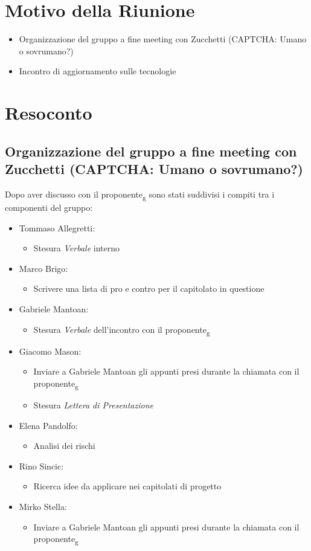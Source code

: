 \section{Motivo della Riunione}
\begin{itemize}
    \item Organizzazione del gruppo a fine meeting con Zucchetti (CAPTCHA: Umano o sovrumano?)
    \item Incontro di aggiornamento sulle tecnologie
\end{itemize}
\section{Resoconto}
\subsection{Organizzazione del gruppo a fine meeting con Zucchetti (CAPTCHA: Umano o sovrumano?)}
Dopo aver discusso con il proponente\textsubscript{g} sono stati suddivisi i compiti tra i componenti del gruppo:
\begin{itemize}
    \item Tommaso Allegretti:
    \begin{itemize}
        \item Stesura \textit{Verbale} interno 
    \end{itemize}
    \item Marco Brigo:
    \begin{itemize}
        \item Scrivere una lista di pro e contro per il capitolato in questione
    \end{itemize}
    \item Gabriele Mantoan:
    \begin{itemize}
        \item Stesura \textit{Verbale} dell'incontro con il proponente\textsubscript{g}
    \end{itemize}
    \item Giacomo Mason:
    \begin{itemize}
        \item Inviare a Gabriele Mantoan gli appunti presi durante la chiamata con il proponente\textsubscript{g}
        \item Stesura \textit{Lettera di Presentazione}
    \end{itemize}
    \item Elena Pandolfo:
    \begin{itemize}
        \item Analisi dei rischi
    \end{itemize}
    \item Rino Sincic:
    \begin{itemize}
        \item Ricerca idee da applicare nei capitolati di progetto
    \end{itemize}
    \item Mirko Stella:
    \begin{itemize}
        \item Inviare a Gabriele Mantoan gli appunti presi durante la chiamata con il proponente\textsubscript{g}
    \end{itemize}
\end{itemize}
